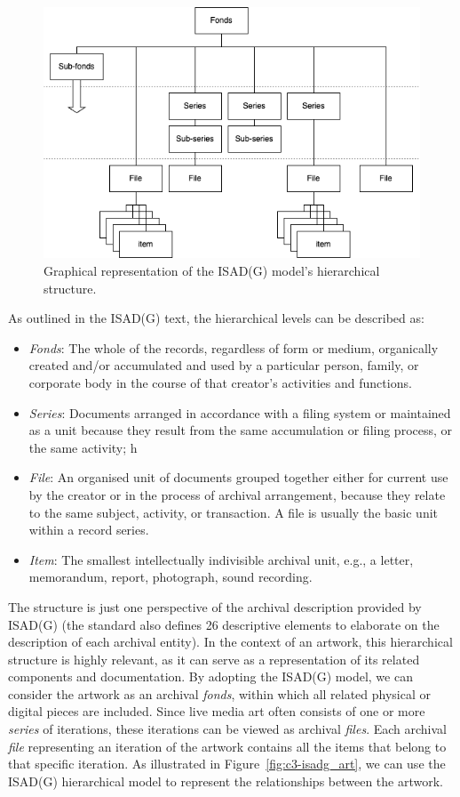 \begin{figure}[!h]
    \centering
    \includegraphics[width=\linewidth]{chapters/3-mdc_model-reactivation_workflow-instruction_template/image/graph03-isadg.png}
    \caption{Graphical representation of the ISAD(G) model’s hierarchical structure.}
    \label{fig:c3-isadg}
\end{figure} 
As outlined in the ISAD(G) text, the hierarchical levels can be described as:
\begin{itemize}
    \item \textit{Fonds}: The whole of the records, regardless of form or medium, organically created and/or accumulated and used by a particular person, family, or corporate body in the course of that creator's activities and functions.
    \item \textit{Series}: Documents arranged in accordance with a filing system or maintained as a unit because they result from the same accumulation or filing process, or the same activity; h
    \item \textit{File}: An organised unit of documents grouped together either for current use by the creator or in the process of archival arrangement, because they relate to the same subject, activity, or transaction. A file is usually the basic unit within a record series.
    \item \textit{Item}: The smallest intellectually indivisible archival unit, e.g., a letter, memorandum, report, photograph, sound recording.
\end{itemize}
The structure is just one perspective of the archival description provided by ISAD(G) (the standard also defines 26 descriptive elements to elaborate on the description of each archival entity). In the context of an artwork, this hierarchical structure is highly relevant, as it can serve as a representation of its related components and documentation. By adopting the ISAD(G) model, we can consider the artwork as an archival \textit{fonds}, within which all related physical or digital pieces are included. Since live media art often consists of one or more \textit{series} of iterations, these iterations can be viewed as archival \textit{files}. Each archival \textit{file} representing an iteration of the artwork contains all the items that belong to that specific iteration. As illustrated in Figure~\ref{fig:c3-isadg_art}, we can use the ISAD(G) hierarchical model to represent the relationships between the artwork.
